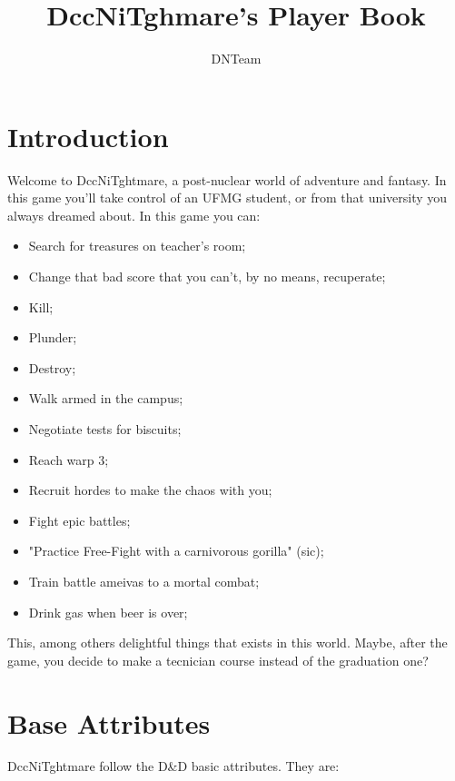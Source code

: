 \documentclass[ letterpaper,12pt]{article}
\begin{document}
\title{\textbf{DccNiTghmare's Player Book}}

\author{
DNTeam
}

\maketitle
{}

\newpage

\tableofcontents

\newpage
\section{Introduction}

Welcome to DccNiTghtmare, a post-nuclear world of adventure and fantasy. In
this game you'll take control of an UFMG student, or from that university you
always dreamed about. In this game you can:

\begin{itemize}
\item{Search for treasures on teacher's room;}
\item{Change that bad score that you can't, by no means, recuperate;}
\item{Kill;}
\item{Plunder;}
\item{Destroy;}
\item{Walk armed in the campus;}
\item{Negotiate tests for biscuits;}
\item{Reach warp 3;}
\item{Recruit hordes to make the chaos with you;}
\item{Fight epic battles;}
\item{"Practice Free-Fight with a carnivorous gorilla" (sic);}
\item{Train battle ameivas to a mortal combat;}
\item{Drink gas when beer is over;}
\end{itemize}

This, among others delightful things that exists in this world. Maybe, after the game, you decide to make a tecnician course instead of the graduation one?

\section{Base Attributes}
DccNiTghtmare follow the D\&D basic attributes. They are:
\end{document}
